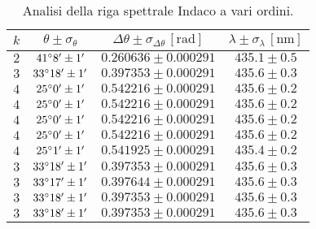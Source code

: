 \documentclass[]{article}
\begin{document}
    \begin{table}
        \centering
        \begin{tabular}{||c|c|c|c||}
            \hline
            $k$ & $\theta \pm \sigma_{\theta}$ & $\Delta\theta \pm \sigma_{\Delta\theta} \, \left[\text{rad}\right]$ & $\lambda \pm \sigma_{\lambda} \, \left[\text{nm}\right]$ \\\hline
            \hline
            $2$ & $41\degree  8' \pm 1'$ & $0.260636 \pm 0.000291$ & $435.1 \pm 0.5$ \\\hline
            $3$ & $33\degree 18' \pm 1'$ & $0.397353 \pm 0.000291$ & $435.6 \pm 0.3$ \\\hline
            $4$ & $25\degree  0' \pm 1'$ & $0.542216 \pm 0.000291$ & $435.6 \pm 0.2$ \\\hline
            $4$ & $25\degree  0' \pm 1'$ & $0.542216 \pm 0.000291$ & $435.6 \pm 0.2$ \\\hline
            $4$ & $25\degree  0' \pm 1'$ & $0.542216 \pm 0.000291$ & $435.6 \pm 0.2$ \\\hline
            $4$ & $25\degree  0' \pm 1'$ & $0.542216 \pm 0.000291$ & $435.6 \pm 0.2$ \\\hline
            $4$ & $25\degree  1' \pm 1'$ & $0.541925 \pm 0.000291$ & $435.4 \pm 0.2$ \\\hline
            $3$ & $33\degree 18' \pm 1'$ & $0.397353 \pm 0.000291$ & $435.6 \pm 0.3$ \\\hline
            $3$ & $33\degree 17' \pm 1'$ & $0.397644 \pm 0.000291$ & $435.6 \pm 0.3$ \\\hline
            $3$ & $33\degree 18' \pm 1'$ & $0.397353 \pm 0.000291$ & $435.6 \pm 0.3$ \\\hline
            $3$ & $33\degree 18' \pm 1'$ & $0.397353 \pm 0.000291$ & $435.6 \pm 0.3$ \\\hline
        \end{tabular}
        \label{indaco}
        \caption{Analisi della riga spettrale Indaco a vari ordini.}
    \end{table}
    
\end{document}
